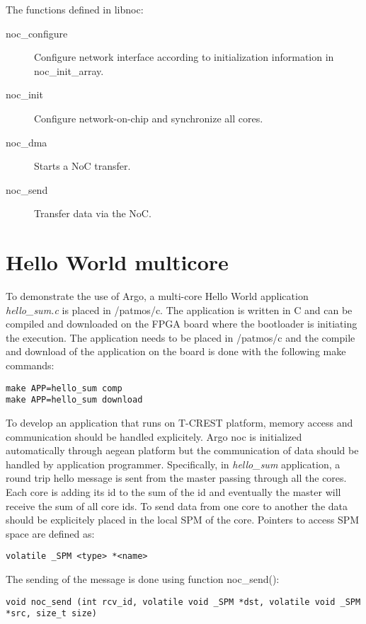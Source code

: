 \documentclass[a4paper,fontsize=10pt,twoside,DIV15,BCOR12mm,headinclude=true,footinclude=false,pagesize,bibtotoc]{scrbook}
\begin{document}
The functions defined in libnoc:
\begin{description}
\item [noc\_configure] Configure network interface according to initialization information in noc\_init\_array.
\item [noc\_init] Configure network-on-chip and synchronize all cores. 
\item [noc\_dma] Starts a NoC transfer. 
\item [noc\_send] Transfer data via the NoC. 
\end{description}


\section{Hello World multicore}

To demonstrate the use of Argo, a multi-core Hello World application \textit{hello\_sum.c} is placed in /patmos/c.
The application is written in C and can be compiled and downloaded on the FPGA board where the bootloader is initiating the execution.
The application needs to be placed in /patmos/c and the compile and download of the application on the board is done with the following make commands:

\begin{verbatim}
make APP=hello_sum comp
make APP=hello_sum download
\end{verbatim}

To develop an application that runs on T-CREST platform, memory access and communication should be handled explicitely.
Argo noc is initialized automatically through aegean platform but the communication of data should be handled by application programmer.
Specifically, in \textit{hello\_sum} application, a round trip hello message is sent from the master passing through all the cores.
Each core is adding its id to the sum of the id and eventually the master will receive the sum of all core ids.
To send data from one core to another the data should be explicitely placed in the local SPM of the core. Pointers to access SPM space are defined as:

\begin{lstlisting}
volatile _SPM <type> *<name>
\end{lstlisting}

The sending of the message is done using function noc\_send():

\begin{lstlisting}
void noc_send (int rcv_id, volatile void _SPM *dst, volatile void _SPM *src, size_t size)
\end{lstlisting}
\end{document}
